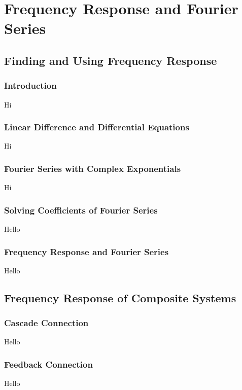 \chapter{Frequency Response and Fourier Series}

\section{Finding and Using Frequency Response}
\subsection{Introduction}
Hi

\subsection{Linear Difference and Differential Equations}
Hi

\subsection{Fourier Series with Complex Exponentials}
Hi

\subsection{Solving Coefficients of Fourier Series}
Hello

\subsection{Frequency Response and Fourier Series}
Hello

\section{Frequency Response of Composite Systems}
\subsection{Cascade Connection}
Hello

\subsection{Feedback Connection}
Hello
